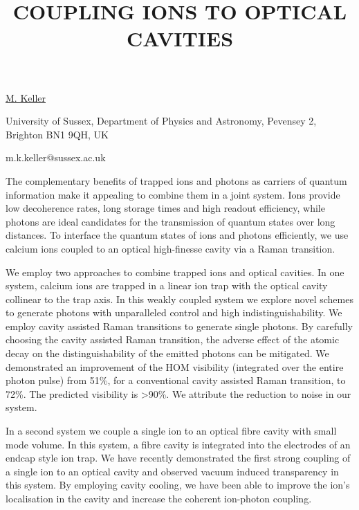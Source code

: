 \title{COUPLING IONS TO OPTICAL CAVITIES}

\underline{M. Keller} 

{\normalsize{\vspace{-4mm}
University of Sussex,
Department of Physics and Astronomy,
Pevensey 2,
Brighton BN1 9QH,
UK



\email m.k.keller@sussex.ac.uk}}

The complementary benefits of trapped ions and photons as carriers of quantum information make it appealing to combine them in a joint system. Ions provide low decoherence rates, long storage times and high readout efficiency, while photons are ideal candidates for the transmission of quantum states over long distances. To interface the quantum states of ions and photons efficiently, we use calcium ions coupled to an optical high-finesse cavity via a Raman transition.

We employ two approaches to combine trapped ions and optical cavities. In one system, calcium ions are trapped in a linear ion trap with the optical cavity collinear to the trap axis. In this weakly coupled system we explore novel schemes to generate photons with unparalleled control and high indistinguishability. We employ cavity assisted Raman transitions to generate single photons. By carefully choosing the cavity assisted Raman transition, the adverse effect of the atomic decay on the distinguishability of the emitted photons can be mitigated. We demonstrated an improvement of the HOM visibility (integrated over the entire photon pulse) from 51\%, for a conventional cavity assisted Raman transition, to 72\%. The predicted visibility is >90\%. We attribute the reduction to noise in our system.

In a second system we couple a single ion to an optical fibre cavity with small mode volume. In this system, a fibre cavity is integrated into the electrodes of an endcap style ion trap. We have recently demonstrated the first strong coupling of a single ion to an optical cavity and observed vacuum induced transparency in this system. By employing cavity cooling, we have been able to improve the ion’s localisation in the cavity and increase the coherent ion-photon coupling.


\vspace{\baselineskip}
